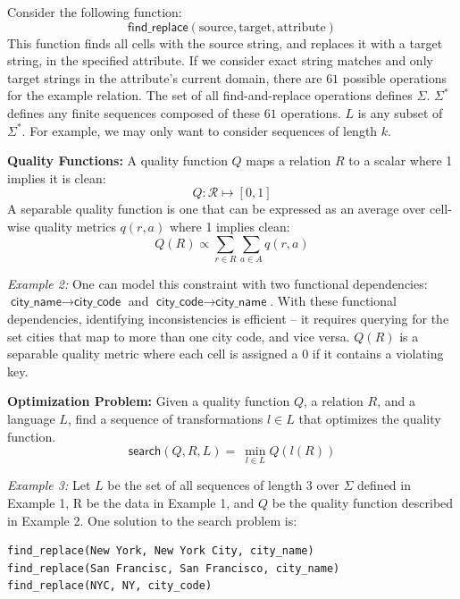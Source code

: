 Consider the following function:
\[
\textsf{find\_replace}(\text{source}, \text{target}, \text{attribute})
\]
This function finds all cells with the source string, and replaces it with a target string, in the specified attribute.
If we consider exact string matches and only target strings in the attribute's current domain, there are $61$ possible operations for the example relation.
The set of all find-and-replace operations defines $\Sigma$.
$\Sigma^*$ defines any finite sequences composed of these $61$ operations.
$L$ is any subset of $\Sigma^*$. 
For example, we may only want to consider sequences of length $k$.



\vspace{0.5em} \noindent \textbf{Quality Functions: } A quality function $Q$ maps a relation $R$ to a scalar where 1 implies it is clean:
\[
Q: \mathcal{R} \mapsto [0,1]
\]
A separable quality function is one that can be expressed as an average over cell-wise quality metrics $q(r,a)$ where 1 implies clean:
\[
Q(R) \propto \sum_{r \in R} \sum_{a \in A} q(r,a)
\]



\vspace{0.5em} \noindent \emph{Example 2: } One can model this constraint with two functional dependencies: $\textsf{city\_name} \rightarrow \textsf{city\_code}$ and $\textsf{city\_code} \rightarrow \textsf{city\_name}$.
With these functional dependencies, identifying inconsistencies is efficient -- it requires querying for the set cities that map to more than one city code, and vice versa. 
$Q(R)$ is a separable quality metric where each cell is assigned a 0  if it contains a violating key. 


\vspace{0.5em} \noindent \textbf{Optimization Problem: } Given a quality function $Q$, a relation $R$, and a language $L$, find a sequence of transformations $l \in L$ that optimizes the quality function.
\[
\textsf{search}(Q,R,L) = ~ \min_{l \in L} Q( l(R) )  
\]

\vspace{0.5em} \noindent \emph{Example 3: } Let $L$ be the set of all sequences of length $3$ over $\Sigma$ defined in Example 1, R be the data in Example 1, and $Q$ be the quality function described in Example 2.
One solution to the search problem is:
\begin{lstlisting}
find_replace(New York, New York City, city_name)
find_replace(San Francisc, San Francisco, city_name)
find_replace(NYC, NY, city_code)
\end{lstlisting}


